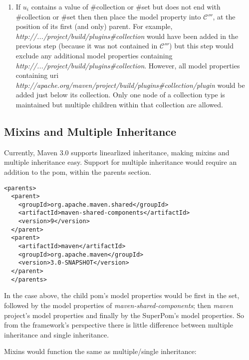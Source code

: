 \documentclass[12pt]{amsart}
\begin{document}
\begin{enumerate}
\item If \begin{math}u_{i}\end{math} contains a value of \#collection or \#set but does not end with  \#collection or \#set then  then place the model property into \begin{math}\mathcal{C'''}\end{math}, at the position of its first (and only) parent. For example,\emph{ http://.../project/build/plugins\#collection }would have been added in the previous step (because it was not contained in \begin{math}\mathcal{C'''}\end{math}) but this step would exclude any additional model properties containing \emph{http://.../project/build/plugins\#collection}.  However, all model properties containing uri \emph{http://apache.org/maven/project/build/plugins\#collection/plugin} would be added just below its collection. Only one node of a collection type is maintained but multiple children within that collection are allowed.

\end{enumerate}

\subsection{Mixins and Multiple Inheritance}
Currently, Maven 3.0 supports linearlized inheritance, making mixins and multiple inheritance easy. Support for multiple inheritance would require an addition to the pom, within the parents section.

\begin{verbatim}
<parents>
  <parent>
    <groupId>org.apache.maven.shared</groupId>
    <artifactId>maven-shared-components</artifactId>
    <version>9</version>
  </parent>
  <parent>
    <artifactId>maven</artifactId>
    <groupId>org.apache.maven</groupId>
    <version>3.0-SNAPSHOT</version>
  </parent>
  </parents>
\end{verbatim}

In the case above, the child pom's model properties would be first in the set, followed by the model properties of \emph{maven-shared-components}; then \emph{maven} project's model properties and finally by the SuperPom's model properties. So from the framework's perspective there is little difference between multiple inheritance and single inheritance.

Mixins would function the same as multiple/single inheritance:
\end{document}

